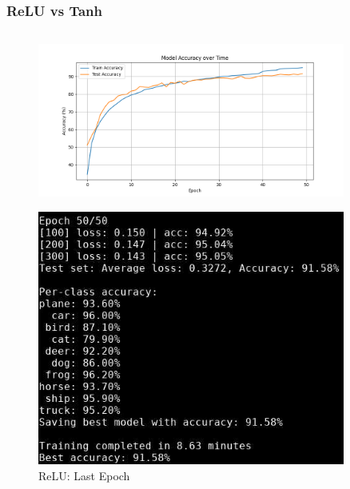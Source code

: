 \documentclass{beamer}
\begin{document}
\begin{frame}
\frametitle{ReLU vs Tanh}
\begin{columns}
    \begin{column}{0.5\textwidth}
        \begin{figure}[t]
            \centering
            \vspace{-0.4cm}
            \includegraphics[width=0.9\textwidth]{media/cifar10_cnn_accuracy.png}
        \end{figure}
        \vspace{-0.8cm}
        \begin{figure}[t]
            \centering
            \includegraphics[width=0.9\textwidth]{media/cnn_epoch_50.png}
            \vspace{-0.3cm}
            \caption{ReLU: Last Epoch}
        \end{figure}
    \end{column}


\end{columns}
\end{frame}
\end{document}
